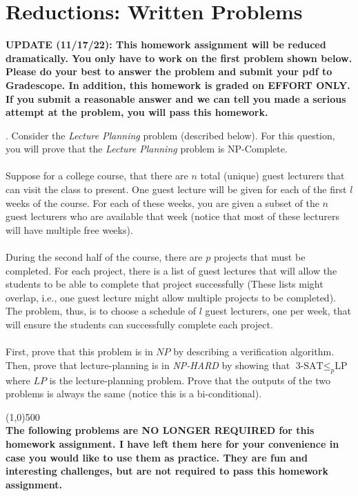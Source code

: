 \documentclass[12pt]{article}
\def\homework{Reductions: Written Problems}
\newcounter{quesnum}
\newcommand{\question}[2][??]{
\begin{list}{\labelitemi}{\leftmargin=2em}
\item [\arabic{quesnum}.] {#2}
\end{list}
\addtocounter{quesnum}{1}
}
\newcommand{\answer}[2][??]{ 
\ifthenelse{\boolean{solution}}{
\color{red} #2 \color{black}}
{\vspace*{#1}}
}
\begin{document}
\section*{\homework}

\noindent
\textbf{UPDATE (11/17/22): This homework assignment will be reduced dramatically. You only have to work on the first problem shown below. Please do your best to answer the problem and submit your pdf to Gradescope. In addition, this homework is graded on EFFORT ONLY. If you submit a reasonable answer and we can tell you made a serious attempt at the problem, you will pass this homework.}


\question[3]{
Consider the \emph{Lecture Planning} problem (described below). For this question, you will prove that the \emph{Lecture Planning} problem is NP-Complete.\\
\\
Suppose for a college course, that there are $n$ total (unique) guest lecturers that can visit the class to present. One guest lecture will be given for each of the first $l$ weeks of the course. For each of these weeks, you are given a subset of the $n$ guest lecturers who are available that week (notice that most of these lecturers will have multiple free weeks).\\
\\
During the second half of the course, there are $p$ projects that must be completed. For each project, there is a list of guest lectures that will allow the students to be able to complete that project successfully (These lists might overlap, i.e., one guest lecture might allow multiple projects to be completed). The problem, thus, is to choose a schedule of $l$ guest lecturers, one per week, that will ensure the students can successfully complete each project.\\
\\
First, prove that this problem is in $NP$ by describing a verification algorithm. Then, prove that lecture-planning is in \emph{NP-HARD} by showing that $\text{3-SAT} \leq_p \text{LP}$ where $LP$ is the lecture-planning problem. Prove that the outputs of the two problems is always the same (notice this is a bi-conditional).
}

\answer[0 in]{
...
}



\vspace{0.2in}
\line(1,0){500}
\\
\noindent
\textbf{The following problems are NO LONGER REQUIRED for this homework assignment. I have left them here for your convenience in case you would like to use them as practice. They are fun and interesting challenges, but are not required to pass this homework assignment.}
\end{document}
